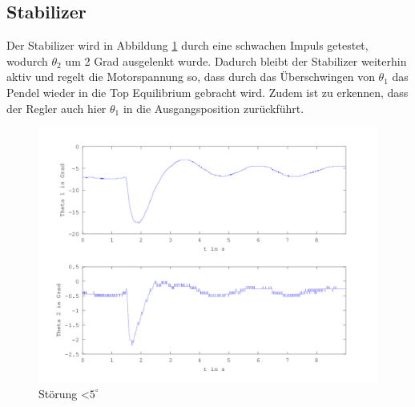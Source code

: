 \subsection{Stabilizer}

Der Stabilizer wird in Abbildung \ref{fig.Stabilisierer-Plot} durch eine schwachen Impuls getestet, wodurch $\theta_2$ um 2 Grad ausgelenkt wurde. Dadurch bleibt der Stabilizer weiterhin aktiv und regelt die Motorspannung so, dass durch das Überschwingen von $ \theta_1$ das Pendel wieder in die Top Equilibrium gebracht wird. Zudem ist zu erkennen, dass der Regler auch hier $ \theta_1$ in die Ausgangsposition zurückführt.

\begin{figure}[htbp]
	\centering
	\includegraphics[width=1.\textwidth]{Grafiken/Stab_lang.png}
	\caption{Störung \textless $5^{\circ}$}
	\label{fig.Stabilisierer-Plot}
\end{figure}


